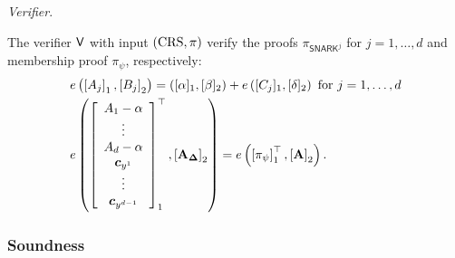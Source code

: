 \noindent \textit{Verifier}. 

The verifier $\mathsf{V}$ with input $(\textnormal{CRS},\pi)$ verify the proofs $\pi_{\textsf{SNARK}^j}$ for $j=1,\dots,d$ and membership proof $\pi_{\psi}$, respectively:
\[\begin{split}
&e\left(\left[A_j\right]_1,\left[B_j\right]_2\right)=\left([\alpha]_1,[\beta]_2\right)+e\left([C_j]_1,[\delta]_2\right) \textnormal{ for }j=1,\dots,d\\
&e\left(\left[\begin{array}{c}
A_1-\alpha\\
\vdots\\
A_d -\alpha\\
\vec{c}_{y^1}\\
\vdots\\
\vec{c}_{y^{d-1}}\\
\end{array}\right]_1^{\top},\left[\mathbf{A}_{\mathbf{\Delta}}\right]_2\right)=e\left(\left[\pi_{\psi}\right]_1^{\top},\left[\mathbf{A}\right]_2\right).\\
\end{split}\]

\subsubsection*{Soundness}


